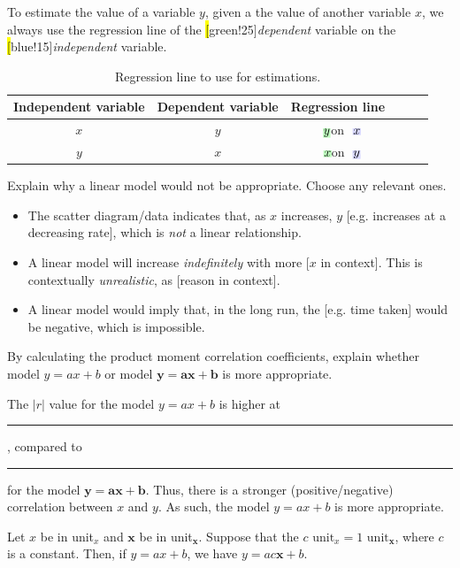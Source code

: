\documentclass[../Notes.tex]{subfiles}
\begin{document}
\begin{note}
  To estimate the value of a variable \(y\), given a the value of another variable \(x\), we always use the regression line of the \hl[green!25]{\emph{dependent} variable} on the \hl[blue!15]{\emph{independent} variable}.
  \begin{table}[H]
    \centering
    \begin{tabular}{>{}Sc>{}ScSc}
      \toprule
      Independent variable & Dependent variable & Regression line\\
      \midrule
      \(x\) & \(y\) & \(\highlight[green!25]{y}\) on \(\highlight[blue!15]{x}\)\\
      \(y\) & \(x\) & \(\highlight[green!25]{x}\) on \(\highlight[blue!15]{y}\)\\
      \bottomrule
    \end{tabular}
    \caption{Regression line to use for estimations.}
    \label{table:regression-line-indepedent-dependent-variable}
  \end{table}
\end{note}
\begin{note}
  Explain why a linear model would not be appropriate. Choose any relevant ones.
    \begin{itemize}
      \item The scatter diagram/data indicates that, as \(x\) increases, \(y\) [e.g. increases at a decreasing rate], which is \emph{not} a linear relationship.
      \item A linear model will increase \emph{indefinitely} with more [\(x\) in context]. This is contextually \emph{unrealistic}, as [reason in context]. 
      \item A linear model would imply that, in the long run, the [e.g. time taken] would be negative, which is impossible.
    \end{itemize}
\end{note}
\begin{note}
  By calculating the product moment correlation coefficients, explain whether model \(y=ax+b\) or model \(\mathbf{y}=\mathbf{a}\mathbf{x}+\mathbf{b}\) is more appropriate.
  \begin{center}
    \parbox{0.9\textwidth}{
      The \(\lvert r \rvert\) value for the model \(y=ax+b\) is higher at \rule{0.5cm}{0.01mm}, compared to \rule{0.5cm}{0.01mm} for the model \(\mathbf{y}=\mathbf{a}\mathbf{x}+\mathbf{b}\). Thus, there is a stronger (positive/negative) correlation between \(x\) and \(y\). As such, the model \(y=ax+b\) is more appropriate.
    }
  \end{center}
\end{note}
\begin{note}
  Let \(x\) be in unit\(_x\) and \(\mathbf{x}\) be in unit\(_{\mathbf{x}}\). Suppose that the \(c\text{ unit}_x=1\text{ unit}_\mathbf{x}\), where \(c\) is a constant. Then, if \(y=ax+b\), we have \(y=ac\mathbf{x}+b\).
\end{note}
\end{document}
